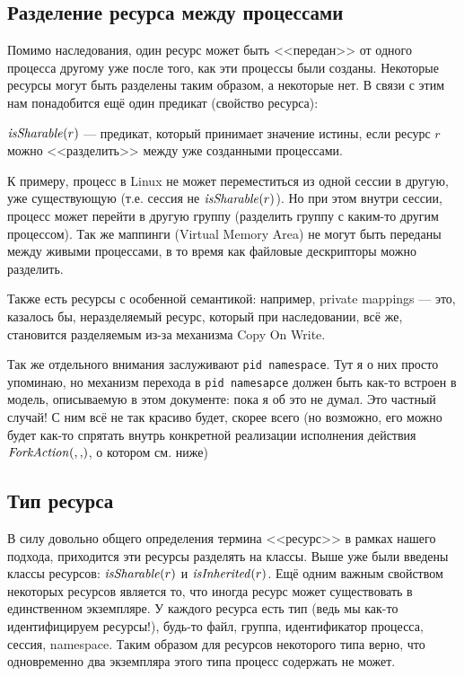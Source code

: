 \subsection{Разделение ресурса между процессами}
\label{subsec:shareres}

Помимо наследования, один ресурс может быть <<передан>> от одного процесса другому уже после того, как эти процессы были созданы. Некоторые ресурсы могут быть разделены таким образом, а некоторые нет. В связи с этим нам понадобится ещё один предикат (свойство ресурса):

\begin{defn}
\label{def:issharable}
$\text{\textit{isSharable}}(r)$ --- предикат, который принимает значение истины, если ресурс $r$ можно <<разделить>> между уже созданными процессами.
\end{defn}

\begin{exmp}
К примеру, процесс в Linux не может переместиться из одной сессии в другую, уже существующую (т.е. сессия не $\text{\textit{isSharable}}(r)$). Но при этом внутри сессии, процесс может перейти в другую группу (разделить группу с каким-то другим процессом). Так же маппинги (Virtual Memory Area) не могут быть переданы между живыми процессами, в то время как файловые дескрипторы можно разделить.
\end{exmp}

Также есть ресурсы с особенной семантикой: например, private mappings --- это, казалось бы, неразделяемый ресурс, который при наследовании, всё же, становится разделяемым из-за механизма Copy On Write.

\begin{note}
Так же отдельного внимания заслуживают \texttt{pid namespace}. Тут я о них просто упоминаю, но механизм перехода в \texttt{pid namesapce} должен быть как-то встроен в модель, описываемую в этом документе: пока я об это не думал. Это частный случай! С ним всё не так красиво будет, скорее всего (но возможно, его можно будет как-то спрятать внутрь конкретной реализации исполнения действия $\crfork{}{}$, о котором см. ниже)
\end{note}

\subsection{Тип ресурса}

В силу довольно общего определения термина <<ресурс>> в рамках нашего подхода, приходится эти ресурсы разделять на классы. Выше уже были введены классы ресурсов: $\text{\textit{isSharable}}(r)$ и $\text{\textit{isInherited}}(r)$. Ещё одним важным свойством некоторых ресурсов является то, что иногда ресурс может существовать в единственном экземпляре. У каждого ресурса есть тип (ведь мы как-то идентифицируем ресурсы!), будь-то файл, группа, идентификатор процесса, сессия, namespace. Таким образом для ресурсов некоторого типа верно, что одновременно два экземпляра этого типа процесс содержать не может.

